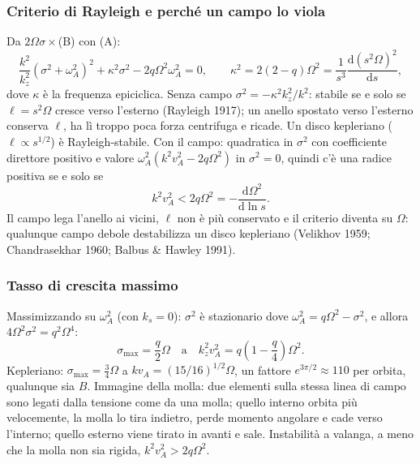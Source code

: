 \subsubsection{Criterio di Rayleigh e perché un campo lo viola}
Da $2\Omega\sigma\times$(B) con (A):
\begin{equation}
\frac{k^2}{k_z^2}\left(\sigma^2+\omega_A^2\right)^2+\kappa^2\sigma^2-2q\Omega^2\omega_A^2=0,\qquad
\kappa^2=2(2-q)\Omega^2=\frac{1}{s^3}\frac{\mathrm{d}(s^2\Omega)^2}{\mathrm{d}s},
\end{equation}
dove $\kappa$ è la frequenza epiciclica. Senza campo $\sigma^2=-\kappa^2k_z^2/k^2$: stabile se e solo se $\ell=s^2\Omega$ cresce verso l'esterno (Rayleigh 1917); un anello spostato verso l'esterno conserva $\ell$, ha lì troppo poca forza centrifuga e ricade. Un disco kepleriano ($\ell\propto s^{1/2}$) è Rayleigh-stabile. Con il campo: quadratica in $\sigma^2$ con coefficiente direttore positivo e valore $\omega_A^2(k^2v_A^2-2q\Omega^2)$ in $\sigma^2=0$, quindi c'è una radice positiva se e solo se
\begin{equation}
k^2v_A^2<2q\Omega^2=-\frac{\mathrm{d}\Omega^2}{\mathrm{d}\ln s}.
\end{equation}
Il campo lega l'anello ai vicini, $\ell$ non è più conservato e il criterio diventa su $\Omega$: qualunque campo debole destabilizza un disco kepleriano (Velikhov 1959; Chandrasekhar 1960; Balbus \& Hawley 1991).

\subsubsection{Tasso di crescita massimo}
Massimizzando su $\omega_A^2$ (con $k_s=0$): $\sigma^2$ è stazionario dove $\omega_A^2=q\Omega^2-\sigma^2$, e allora $4\Omega^2\sigma^2=q^2\Omega^4$:
\begin{equation}
\sigma_{\max}=\frac q2\Omega\quad\text{a}\quad k_z^2v_A^2=q\left(1-\frac q4\right)\Omega^2 .
\end{equation}
Kepleriano: $\sigma_{\max}=\tfrac34\Omega$ a $kv_A=(15/16)^{1/2}\Omega$, un fattore $e^{3\pi/2}\approx110$ per orbita, qualunque sia $B$. Immagine della molla: due elementi sulla stessa linea di campo sono legati dalla tensione come da una molla; quello interno orbita più velocemente, la molla lo tira indietro, perde momento angolare e cade verso l'interno; quello esterno viene tirato in avanti e sale. Instabilità a valanga, a meno che la molla non sia rigida, $k^2v_A^2>2q\Omega^2$.

